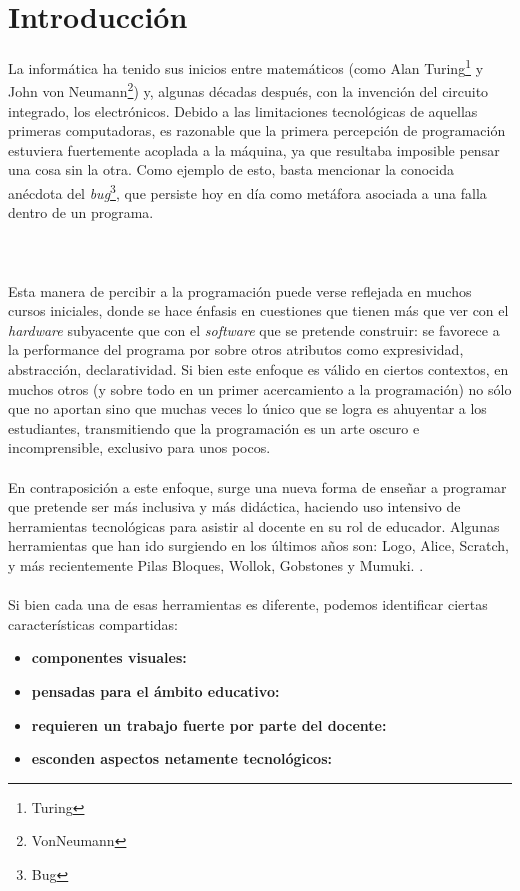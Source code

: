 \newcommand{\caracteristica}[1]{\item \textbf{#1:}}

\section{Introducción}
La informática ha tenido sus inicios entre matemáticos (como Alan Turing\footnote{Turing} y John von Neumann\footnote{VonNeumann}) y, algunas décadas después, con la invención del circuito integrado, los electrónicos. Debido a las limitaciones tecnológicas de aquellas primeras computadoras, es razonable que la primera percepción de programación estuviera fuertemente acoplada a la máquina, ya que resultaba imposible pensar una cosa sin la otra. Como ejemplo de esto, basta mencionar la conocida anécdota del \textit{bug}\footnote{Bug}, que persiste hoy en día como metáfora asociada a una falla dentro de un programa.
\\\\
\\\\
Esta manera de percibir a la programación puede verse reflejada en muchos cursos iniciales, donde se hace énfasis en cuestiones que tienen más que ver con el \textit{hardware} subyacente que con el \textit{software} que se pretende construir: se favorece a la performance del programa por sobre otros atributos como expresividad, abstracción, declaratividad. Si bien este enfoque es válido en ciertos contextos, en muchos otros (y sobre todo en un primer acercamiento a la programación) no sólo que no aportan sino que muchas veces lo único que se logra es ahuyentar a los estudiantes, transmitiendo que la programación es un arte oscuro e incomprensible, exclusivo para unos pocos.
\\\\
En contraposición a este enfoque, surge una nueva forma de enseñar a programar que pretende ser más inclusiva y más didáctica, haciendo uso intensivo de herramientas tecnológicas para asistir al docente en su rol de educador. Algunas herramientas que han ido surgiendo en los últimos años son: Logo, Alice, Scratch, y más recientemente Pilas Bloques, Wollok, Gobstones y Mumuki. .
\\\\
Si bien cada una de esas herramientas es diferente, podemos identificar ciertas características compartidas:
\begin{itemize}
  \caracteristica{componentes visuales}
  \caracteristica{pensadas para el ámbito educativo}
  \caracteristica{requieren un trabajo fuerte por parte del docente}
  \caracteristica{esconden aspectos netamente tecnológicos}
\end{itemize}

